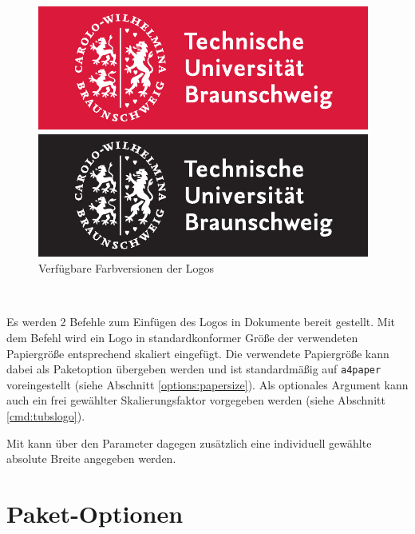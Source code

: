 \begin{figure}[!ht]
\begin{minipage}{0.5\textwidth}
  \centering
  \includegraphics[width=\tubslogoBaseWidth]{TUBraunschweig_SC}
\end{minipage}
\begin{minipage}{0.5\textwidth}
  \centering
  \includegraphics[width=\tubslogoBaseWidth]{TUBraunschweig_B}
\end{minipage}
\caption{Verfügbare Farbversionen der Logos}
\end{figure}

\begin{Declaration}
  \\
\end{Declaration}


Es werden 2 Befehle zum Einfügen des Logos in Dokumente bereit gestellt.
Mit dem Befehl  wird ein Logo in
standardkonformer Größe der verwendeten Papiergröße entsprechend skaliert
eingefügt. Die verwendete Papiergröße kann dabei als Paketoption übergeben
werden und ist standardmäßig auf \lstinline{a4paper} voreingestellt
(siehe Abschnitt \ref{options:papersize}).
Als optionales Argument kann auch ein frei gewählter Skalierungsfaktor
vorgegeben werden (siehe Abschnitt \ref{cmd:tubslogo}).

Mit  kann über den Parameter  dagegen
zusätzlich eine individuell gewählte absolute Breite angegeben werden.


\section{Paket-Optionen}

